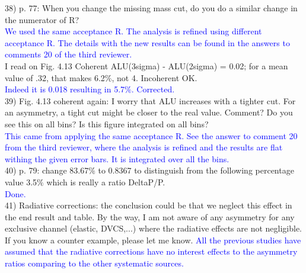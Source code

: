 38) p. 77: When you change the missing mass cut, do you do a similar change in 
the numerator of R? \\
\textcolor{blue}{We used the same acceptance R. The analysis is refined using 
different acceptance R. The details with the new results can be found in the 
answers to comments 20 of the third reviewer.  }\\

I read on Fig. 4.13 Coherent ALU(3sigma) - ALU(2sigma) = 0.02; for a mean value 
of .32, that makes 6.2$\%$, not 4. Incoherent OK.\\
\textcolor{blue}{ Indeed it is 0.018 resulting in 5.7$\%$. Corrected.}\\

39) Fig. 4.13 coherent again: I worry that ALU increases with a tighter cut.  
For an asymmetry, a tight cut might be closer to the real value. Comment?  Do 
you see this on all bins? Is this figure integrated on all bins?\\
\textcolor{blue}{ This came from applying the same acceptance R. See the answer 
to comment 20 from the third reviewer, where the analysis is refined and the 
results are flat withing the given error bars. It is integrated over all the 
bins.  }\\

40) p. 79: change 83.67$\%$ to 0.8367 to distinguish from the following 
percentage value 3.5$\%$ which is really a ratio DeltaP/P.\\
\textcolor{blue}{ Done.}\\

41) Radiative corrections: the conclusion could be that we neglect this effect in 
the end result and table. By the way, I am not aware of any asymmetry for any 
exclusive channel (elastic, DVCS,...) where the radiative effects are not 
negligible. If you know a counter example, please let me know.
\textcolor{blue}{ All the previous studies have assumed that the radiative 
corrections have no interest effects to the asymmetry ratios comparing to the 
other systematic sources. }\\

